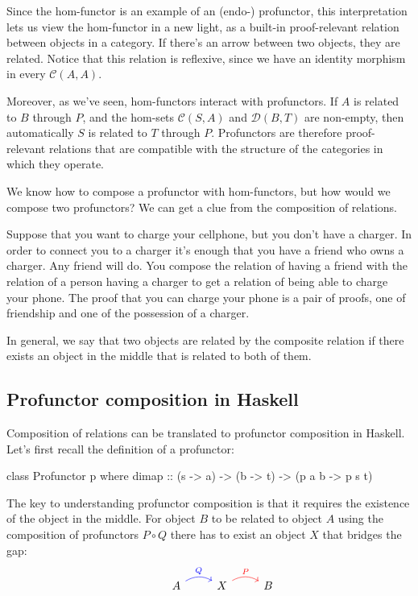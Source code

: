 \documentclass[DaoFP]{subfiles}
\begin{document}
Since the hom-functor is an example of an (endo-) profunctor, this interpretation lets us view the hom-functor in a new light, as a built-in proof-relevant relation between objects in a category. If there's an arrow between two objects, they are related. Notice that this relation is reflexive, since we have an identity morphism in every $\mathcal{C}(A, A)$. 

Moreover, as we've seen, hom-functors interact with profunctors. If $A$ is related to $B$ through $P$, and the hom-sets $\mathcal{C}(S, A)$ and $\mathcal{D}(B, T)$ are non-empty, then automatically $S$ is related to $T$ through $P$. Profunctors are therefore proof-relevant relations that are compatible with the structure of the categories in which they operate.

We know how to compose a profunctor with hom-functors, but how would we compose two profunctors? We can get a clue from the composition of relations. 

Suppose that you want to charge your cellphone, but you don't have a charger. In order to connect you to a charger it's enough that you have a friend who owns a charger. Any friend will do. You compose the relation of having a friend with the relation of a person having a charger to get a relation of being able to charge your phone. The proof that you can charge your phone is a pair of proofs, one of friendship and one of the possession of a charger. 

In general, we say that two objects are related by the composite relation if there exists an object in the middle that is related to both of them. 

\subsection{Profunctor composition in Haskell}

Composition of relations can be translated to profunctor composition in Haskell. Let's first recall the definition of a profunctor:
\begin{haskell}
class Profunctor p where
  dimap :: (s -> a) -> (b -> t) -> (p a b -> p s t)
\end{haskell}

The key to understanding profunctor composition is that it requires the existence of the object in the middle. For object $B$ to be related to object $A$ using the composition of profunctors $P \circ Q$ there has to exist an object $X$ that bridges the gap:
\[
 \begin{tikzcd}
  & A
  \arrow[r, bend left, blue, "Q"]
 & X
  \arrow[r, bend left, red, "P"]
 & B
  \end{tikzcd}
\]
\end{document}
